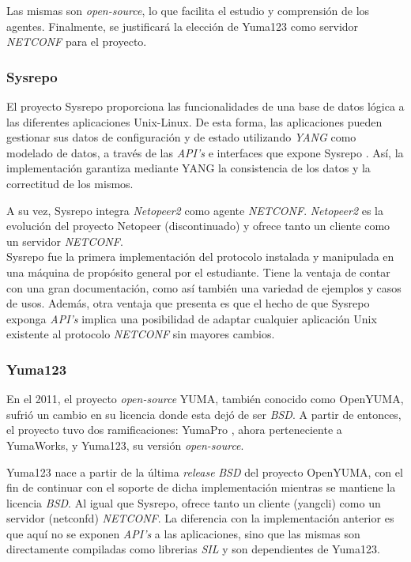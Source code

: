 Las mismas son \textit{open-source}, lo que facilita el estudio y comprensión de los agentes. Finalmente, se justificará la elección de Yuma123 como servidor \textit{NETCONF} para el proyecto.

\subsubsection{Sysrepo}
El proyecto Sysrepo proporciona las funcionalidades de una base de datos lógica a las diferentes aplicaciones Unix-Linux. De esta forma, las aplicaciones pueden gestionar sus datos de configuración y de estado utilizando \textit{YANG} como modelado de datos, a través de las \textit{API’s} e interfaces que expone Sysrepo \parencite{sysrepogit}. Así, la implementación garantiza mediante YANG la consistencia de los datos y la correctitud de los mismos. 

A su vez, Sysrepo integra \textit{Netopeer2} \parencite{netopeergit} como agente \textit{NETCONF}. \textit{Netopeer2} es la evolución del proyecto Netopeer \parencite{netopeergit1} (discontinuado) y ofrece tanto un cliente como un servidor \textit{NETCONF}.
\\

Sysrepo fue la primera implementación del protocolo instalada y manipulada en una máquina de propósito general por el estudiante. Tiene la ventaja de contar con una gran documentación, como así también una variedad de ejemplos y casos de usos. Además, otra ventaja que presenta es que el hecho de que Sysrepo exponga \textit{API’s} implica una posibilidad de adaptar cualquier aplicación Unix existente al protocolo \textit{NETCONF} sin mayores cambios.  

\subsubsection{Yuma123}
En el 2011, el proyecto \textit{open-source} YUMA, también conocido como OpenYUMA, sufrió un cambio en su licencia donde esta dejó de ser \textit{BSD}. A partir de entonces, el proyecto tuvo dos ramificaciones: YumaPro \parencite{yumapro}, ahora perteneciente a YumaWorks, y Yuma123, su versión \textit{open-source}. 

Yuma123 nace a partir de la última \textit{release} \textit{BSD} del proyecto OpenYUMA, con el fin de continuar con el soporte de dicha implementación mientras se mantiene la licencia \textit{BSD}. Al igual que Sysrepo, ofrece tanto un cliente (yangcli) como un servidor (netconfd) \textit{NETCONF}. La diferencia con la implementación anterior es que aquí no se exponen \textit{API’s} a las aplicaciones, sino que las mismas son directamente compiladas como librerias \textit{SIL} y son dependientes de Yuma123.
\\


